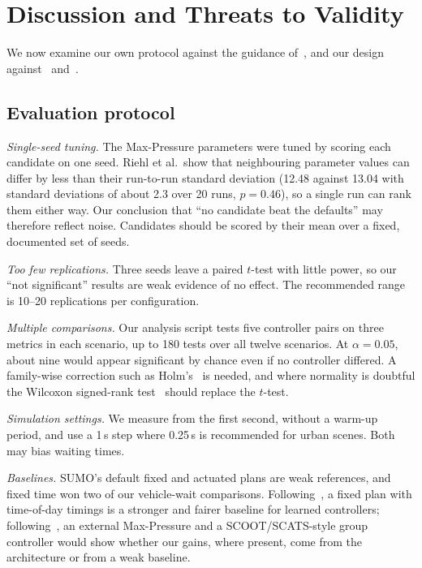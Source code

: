 \documentclass[conference]{IEEEtran}
\begin{document}
\section{Discussion and Threats to Validity}\label{sec:discussion}

We now examine our own protocol against the guidance of~\cite{riehl2026sumoitscontrol}, and
our design against~\cite{azevedo2016jade} and~\cite{li2026decoupled}.

\subsection{Evaluation protocol}
\emph{Single-seed tuning.} The Max-Pressure parameters were tuned by scoring each candidate
on one seed. Riehl et al.\ show that neighbouring parameter values can differ by less than
their run-to-run standard deviation (12.48 against 13.04 with standard deviations of about
2.3 over 20 runs, $p=0.46$), so a single run can rank them either way. Our conclusion that
``no candidate beat the defaults'' may therefore reflect noise. Candidates should be scored
by their mean over a fixed, documented set of seeds.

\emph{Too few replications.} Three seeds leave a paired $t$-test with little power, so our
``not significant'' results are weak evidence of no effect. The recommended range is 10--20
replications per configuration.

\emph{Multiple comparisons.} Our analysis script tests five controller pairs on three
metrics in each scenario, up to 180 tests over all twelve scenarios. At $\alpha=0.05$, about
nine would appear significant by chance even if no controller differed. A family-wise
correction such as Holm's~\cite{holm1979} is needed, and where normality is doubtful the
Wilcoxon signed-rank test~\cite{wilcoxon1945} should replace the $t$-test.

\emph{Simulation settings.} We measure from the first second, without a warm-up period, and
use a 1\,s step where 0.25\,s is recommended for urban scenes. Both may bias waiting times.

\emph{Baselines.} SUMO's default fixed and actuated plans are weak references, and fixed
time won two of our vehicle-wait comparisons. Following~\cite{azevedo2016jade}, a fixed plan
with time-of-day timings is a stronger and fairer baseline for learned controllers;
following~\cite{riehl2026sumoitscontrol}, an external Max-Pressure and a SCOOT/SCATS-style
group controller would show whether our gains, where present, come from the architecture or
from a weak baseline.
\end{document}
